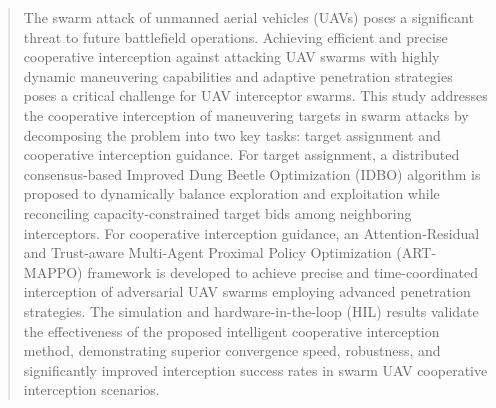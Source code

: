 \documentclass[lettersize,journal]{IEEEtran}
\providecommand{\DIFadd}[1]{{\protect\color{blue} #1}} %
\providecommand{\DIFdel}[1]{} %
\providecommand{\DIFaddbegin}{} %
\providecommand{\DIFaddend}{} %
\providecommand{\DIFdelbegin}{} %
\providecommand{\DIFdelend}{} %
\begin{document}
\begin{abstract}
The swarm attack of unmanned aerial vehicles (UAVs) poses a significant threat to future
battlefield operations.
Achieving efficient and precise cooperative interception against attacking UAV swarms with
highly dynamic maneuvering capabilities and adaptive penetration strategies poses a critical
challenge for UAV interceptor swarms.
This study addresses the cooperative interception of maneuvering targets in swarm attacks by
decomposing the problem into two key tasks: target assignment and cooperative interception
guidance.
For target assignment, \DIFdelbegin \DIFdel{an }\DIFdelend \DIFaddbegin \DIFadd{a distributed consensus-based }\DIFaddend Improved Dung Beetle
Optimization (IDBO) algorithm is proposed to dynamically balance exploration
and exploitation \DIFdelbegin \DIFdel{, achieving highly efficient and rapid
assignments}\DIFdelend \DIFaddbegin \DIFadd{while reconciling capacity-constrained target bids among
neighboring interceptors}\DIFaddend .
For cooperative interception guidance, an Attention-Residual and Trust-aware Multi-Agent Proximal Policy Optimization (ART-MAPPO) framework is developed to achieve precise and time-coordinated interception of adversarial UAV swarms employing advanced penetration strategies.
The simulation \DIFaddbegin \DIFadd{and hardware-in-the-loop (HIL) }\DIFaddend results validate the effectiveness
of the proposed intelligent cooperative interception method, demonstrating
superior convergence speed, robustness, and significantly improved interception
success rates in swarm UAV cooperative interception scenarios.
\end{abstract}
\end{document}
